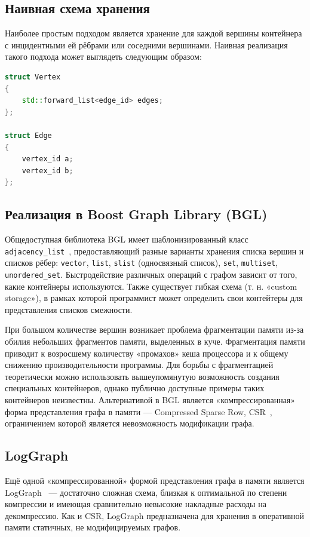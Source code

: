 \documentclass{article}
\theoremstyle{definition}
\begin{document}
\subsection{Наивная схема хранения}
Наиболее простым подходом 
является хранение для каждой вершины контейнера с инцидентными ей рёбрами или соседними вершинами. 
Наивная реализация такого подхода может выглядеть следующим образом:

\begin{lstlisting}[language=C++]
struct Vertex 
{
    std::forward_list<edge_id> edges;
};

struct Edge 
{
    vertex_id a;
    vertex_id b;
};
\end{lstlisting}

\subsection{Реализация в Boost Graph Library (BGL)}

Общедоступная библиотека BGL имеет шаблонизированный класс \texttt{adjacency\_list}~\cite{BGLadj}, предоставляющий разные варианты хранения списка вершин и списков рёбер:
\texttt{vector}, \texttt{list}, \texttt{slist} (односвязный список), \texttt{set}, \texttt{multiset}, \texttt{unordered\_set}. Быстродействие
различных операций с графом зависит от того, какие контейнеры используются. Также существует гибкая схема (т. н. «custom storage»), в рамках
которой программист может определить свои контейтеры для представления списков смежности.

При большом количестве вершин возникает проблема фрагментации памяти
из-за обилия небольших фрагментов памяти, выделенных в
куче. Фрагментация памяти приводит к возросшему количеству «промахов»
кеша процессора и к общему снижению производительности
программы. Для борьбы с фрагментацией теоретически можно использовать
вышеупомянутую возможность создания специальных контейнеров, однако
публично доступные примеры таких контейнеров неизвестны. Альтернативой
в BGL является «компрессированная» форма представления графа в памяти
— Compressed Sparse Row, CSR~\cite{BGLCSR}, ограничением которой является
невозможность модификации графа.

\subsection{LogGraph}

Ещё одной «компрессированной» формой представления графа в памяти
является LogGraph~\cite{LogGraph} — достаточно сложная схема,
близкая к оптимальной по степени компрессии и имеющая сравнительно
невысокие накладные расходы на декомпрессию. Как и CSR, LogGraph
предназначена для хранения в оперативной памяти статичных, не
модифицируемых графов.
\end{document}
